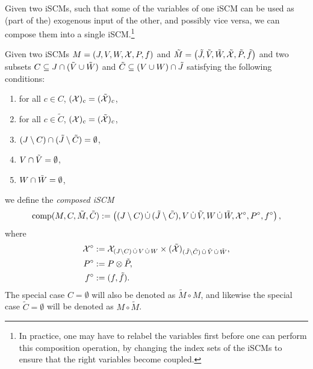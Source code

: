 Given two iSCMs, such that some of the variables of one iSCM can be used as (part of the) exogenous input of the other, and possibly vice versa, we can compose them into a single iSCM.\footnote{In practice, one may have to relabel the variables first before one can perform this composition operation, by changing the index sets of the iSCMs to ensure that the right variables become coupled.}
\begin{Def}\label{def:compose_scm}
  Given two iSCMs $M = \left ( J, V, W, \mathcal{X}, P, f \right )$ and $\tilde M = \left ( \tilde {J}, \tilde {V}, \tilde {W}, \tilde {\mathcal{X}}, \tilde P, \tilde f \right )$ and two subsets $C \subseteq J \cap (\tilde {V} \cup \tilde {W})$ and $\tilde C \subseteq (V \cup W) \cap \tilde {J}$ satisfying the following conditions:
  \begin{enumerate}
    \item for all $c \in C$, $(\mathcal{X})_c = (\tilde {\mathcal{X}})_c$,
    \item for all $c \in \tilde C$, $(\mathcal{X})_c = (\tilde {\mathcal{X}})_c$,
    \item $(J \setminus C) \cap (\tilde {J} \setminus \tilde C) = \emptyset$,
    \item $V \cap \tilde {V} = \emptyset$,
    \item $W \cap \tilde {W} = \emptyset$,
  \end{enumerate}
  we define the \emph{composed iSCM}
  $$\mathrm{comp}(M,C,\tilde{M},\tilde{C}) := \left ( (J \setminus C) \,\dot{\cup}\, (\tilde {J} \setminus \tilde C), V \,\dot{\cup}\, \tilde {V}, W \,\dot{\cup}\, \tilde {W}, \mathcal{X}^\circ, P^\circ, f^\circ \right ),$$
  where
  \begin{align*}
    \mathcal{X}^\circ &:= \mathcal{X}_{(J \setminus C) \,\dot{\cup}\, V \,\dot{\cup}\, W} \times (\tilde {\mathcal{X}})_{(\tilde {J} \setminus \tilde C) \,\dot{\cup}\, \tilde {V} \,\dot{\cup}\, \tilde {W}}, \\
    P^\circ &:= P \otimes \tilde P, \\
    f^\circ &:= (f, \tilde f).
  \end{align*}
  The special case $C = \emptyset$ will also be denoted as $\tilde M \circ M$, and likewise the special case $\tilde C = \emptyset$ will be denoted as $M \circ \tilde M$.
\end{Def}

